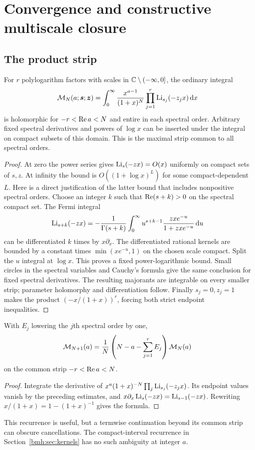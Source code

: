 \section{Convergence and constructive multiscale closure}\label{bmh:sec:closure}

\subsection{The product strip}
\begin{proposition}\label{bmh:prop:strip}
For $r$ polylogarithm factors with scales in
$\mathbb C\setminus(-\infty,0]$, the ordinary integral
\[
 \mathcal M_N(a;\boldsymbol s;\boldsymbol z)=
 \int_0^\infty\frac{x^{a-1}}{(1+x)^N}
       \prod_{j=1}^r\operatorname{Li}_{s_j}(-z_jx)\,\mathrm d x
\]
is holomorphic for $-r<\operatorname{Re} a<N$ and entire in each spectral order.
Arbitrary fixed spectral derivatives and powers of $\log x$ can be
inserted under the integral on compact subsets of this domain.
This is the maximal strip common to all spectral orders.
\end{proposition}
\begin{proof}
At zero the power series gives $\operatorname{Li}_s(-zx)=O(x)$ uniformly on compact
sets of $s,z$. At infinity the bound is $O((1+\log x)^L)$ for some
compact-dependent $L$. Here is a direct justification of the latter
bound that includes nonpositive spectral orders. Choose an integer $k$
such that $\operatorname{Re}(s+k)>0$ on the spectral compact set. The Fermi integral
\[
 \operatorname{Li}_{s+k}(-zx)=-\frac1{\Gamma(s+k)}\int_0^\infty
 u^{s+k-1}\frac{zx e^{-u}}{1+zx e^{-u}}\,\mathrm d u
\]
can be differentiated $k$ times by $x\partial_x$. The differentiated
rational kernels are bounded by a constant times
$\min(xe^{-u},1)$ on the chosen scale compact. Split the $u$ integral at
$\log x$. This proves a fixed power-logarithmic bound. Small circles in
the spectral variables and Cauchy's formula give the same conclusion
for fixed spectral derivatives. The resulting majorants are integrable
on every smaller strip; parameter holomorphy and differentiation follow.
Finally $s_j=0,z_j=1$ makes the product $(-x/(1+x))^r$, forcing both
strict endpoint inequalities.
\end{proof}

\begin{proposition}\label{bmh:prop:Nrec}
With $E_j$ lowering the $j$th spectral order by one,
\begin{equation}\label{bmh:eq:Nrec}
 \mathcal M_{N+1}(a)=\frac1N\left(N-a-\sum_{j=1}^rE_j\right)\mathcal M_N(a)
\end{equation}
on the common strip $-r<\operatorname{Re} a<N$.
\end{proposition}
\begin{proof}
Integrate the derivative of
$x^a(1+x)^{-N}\prod_j\operatorname{Li}_{s_j}(-z_jx)$. Its endpoint values vanish by
the preceding estimates, and
$x\partial_x\operatorname{Li}_s(-zx)=\operatorname{Li}_{s-1}(-zx)$. Rewriting
$x/(1+x)=1-(1+x)^{-1}$ gives the formula.
\end{proof}
This recurrence is useful, but a termwise continuation beyond its common
strip can obscure cancellations. The compact-interval recurrence in
Section~\ref{bmh:sec:kernels} has no such ambiguity at integer $a$.

